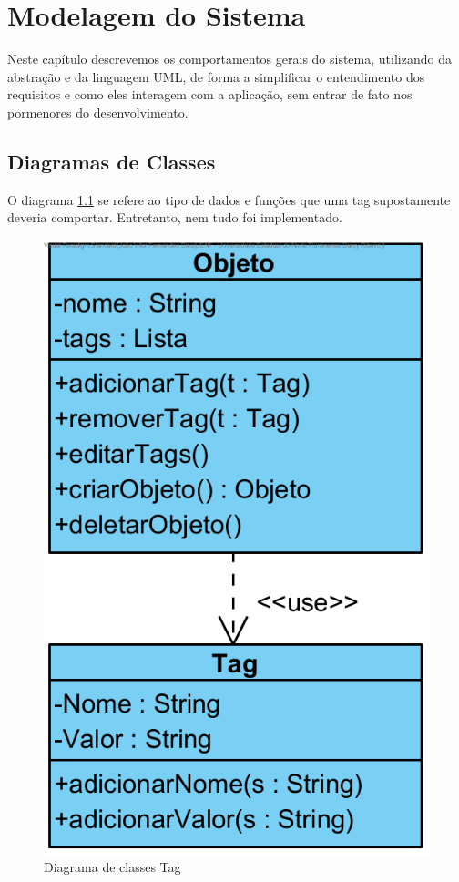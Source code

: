 
\chapter{Modelagem do Sistema}

Neste capítulo descrevemos os comportamentos gerais do sistema, utilizando da abstração e da linguagem UML, de forma a simplificar o entendimento dos requisitos e como eles interagem com a aplicação, sem entrar de fato nos pormenores do desenvolvimento.

\section{Diagramas de Classes}
    O diagrama \ref{DiagClasses} se refere ao tipo de dados e funções que uma tag supostamente deveria comportar. Entretanto, nem tudo foi implementado.
    \begin{figure}[H]
        \begin{center}
            \includegraphics[width=12cm]{Pictures/JV/Diagramas/Sistema Tag - Diagrama de Classes.png}
            \caption{Diagrama de classes Tag} \label{DiagClasses}
        \end{center}
    \end{figure} 
